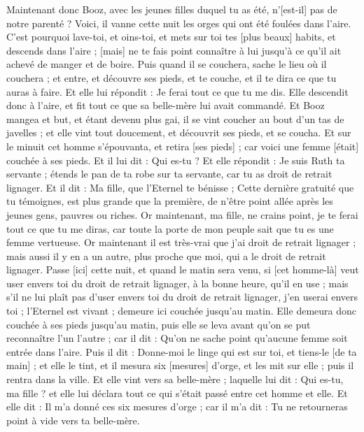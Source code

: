\begin{multicols}{2}
Maintenant donc Booz, avec les jeunes filles duquel tu as été, n'[est-il] pas de notre parenté ? Voici, il vanne cette nuit les orges qui ont été foulées dans l'aire.
C'est pourquoi lave-toi, et oins-toi, et mets sur toi tes [plus beaux] habits, et descends dans l'aire ; [mais] ne te fais point connaître à lui jusqu'à ce qu'il ait achevé de manger et de boire.
Puis quand il se couchera, sache le lieu où il couchera ; et entre, et découvre ses pieds, et te couche, et il te dira ce que tu auras à faire.
Et elle lui répondit : Je ferai tout ce que tu me dis.
Elle descendit donc à l'aire, et fit tout ce que sa belle-mère lui avait commandé.
Et Booz mangea et but, et étant devenu plus gai, il se vint coucher au bout d'un tas de javelles ; et elle vint tout doucement, et découvrit ses pieds, et se coucha.
Et sur le minuit cet homme s'épouvanta, et retira [ses pieds] ; car voici une femme [était] couchée à ses pieds.
Et il lui dit : Qui es-tu ? Et elle répondit : Je suis Ruth ta servante ; étends le pan de ta robe sur ta servante, car tu as droit de retrait lignager.
Et il dit : Ma fille, que l'Eternel te bénisse ; Cette dernière gratuité que tu témoignes, est plus grande que la première, de n'être point allée après les jeunes gens, pauvres ou riches.
Or maintenant, ma fille, ne crains point, je te ferai tout ce que tu me diras, car toute la porte de mon peuple sait que tu es une femme vertueuse.
Or maintenant il est très-vrai que j'ai droit de retrait lignager ; mais aussi il y en a un autre, plus proche que moi, qui a le droit de retrait lignager.
Passe [ici] cette nuit, et quand le matin sera venu, si [cet homme-là] veut user envers toi du droit de retrait lignager, à la bonne heure, qu'il en use ; mais s'il ne lui plaît pas d'user envers toi du droit de retrait lignager, j'en userai envers toi ; l'Eternel est vivant ; demeure ici couchée jusqu'au matin.
Elle demeura donc couchée à ses pieds jusqu'au matin, puis elle se leva avant qu'on se put reconnaître l'un l'autre ; car il dit : Qu'on ne sache point qu'aucune femme soit entrée dans l'aire.
Puis il dit : Donne-moi le linge qui est sur toi, et tiens-le [de ta main] ; et elle le tint, et il mesura six [mesures] d'orge, et les mit sur elle ; puis il rentra dans la ville.
Et elle vint vers sa belle-mère ; laquelle lui dit : Qui es-tu, ma fille ? et elle lui déclara tout ce qui s'était passé entre cet homme et elle.
Et elle dit : Il m'a donné ces six mesures d'orge ; car il m'a dit : Tu ne retourneras point à vide vers ta belle-mère.

\end{multicols}
